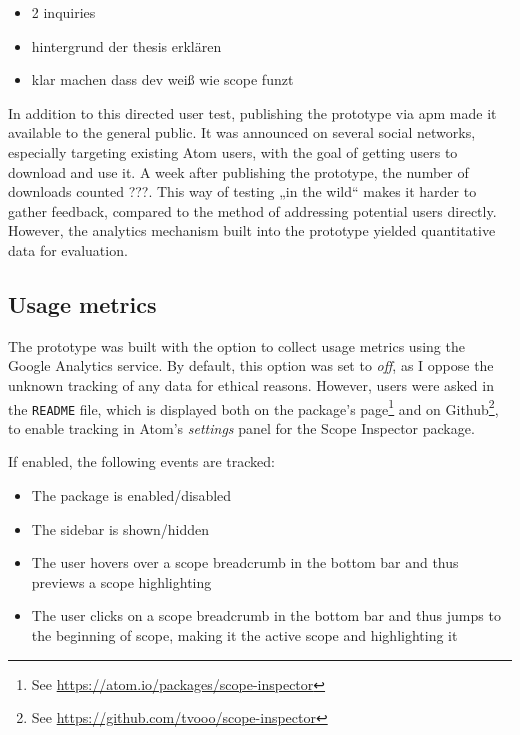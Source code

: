 \begin{itemize}
\itemsep1pt\parskip0pt
\item
  2 inquiries
\item
  hintergrund der thesis erklären
\item
  klar machen dass dev weiß wie scope funzt
\end{itemize}

In addition to this directed user test, publishing the prototype via
\ac{apm} made it available to the general public. It was announced on
several social networks, especially targeting existing Atom users, with
the goal of getting users to download and use it. A week after
publishing the prototype, the number of downloads counted ???. This way
of testing „in the wild“ makes it harder to gather feedback, compared to
the method of addressing potential users directly. However, the
analytics mechanism built into the prototype yielded quantitative data
for evaluation.

\subsection{Usage metrics}\label{usage-metrics}

The prototype was built with the option to collect usage metrics using
the Google Analytics service. By default, this option was set to
\emph{off}, as I oppose the unknown tracking of any data for ethical
reasons. However, users were asked in the \texttt{README} file, which is
displayed both on the package’s
page\footnote{See \url{https://atom.io/packages/scope-inspector}} and on
Github\footnote{See \url{https://github.com/tvooo/scope-inspector}}, to
enable tracking in Atom’s \emph{settings} panel for the Scope Inspector
package.

If enabled, the following events are tracked:

\begin{itemize}
\itemsep1pt\parskip0pt
\item
  The package is enabled/disabled
\item
  The sidebar is shown/hidden
\item
  The user hovers over a scope breadcrumb in the bottom bar and thus
  previews a scope highlighting
\item
  The user clicks on a scope breadcrumb in the bottom bar and thus jumps
  to the beginning of scope, making it the active scope and highlighting
  it
\end{itemize}

